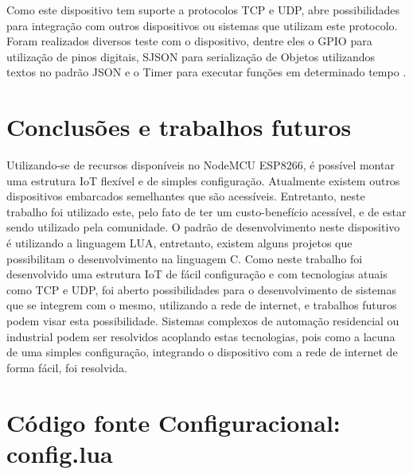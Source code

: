 \documentclass[journal]{IEEEtran}
\begin{document}
Como este dispositivo tem suporte a protocolos TCP e UDP, abre possibilidades para integração com outros dispositivos ou sistemas que utilizam este protocolo. Foram realizados diversos teste com o dispositivo, dentre eles o GPIO \cite{nodemcugpio} para utilização de pinos digitais, SJSON para serialização de Objetos utilizandos textos no padrão JSON \cite{nodemcujson} e o Timer para executar funções em determinado tempo \cite{nodemcutimer}.


\section{Conclusões e trabalhos futuros}
Utilizando-se de recursos disponíveis no NodeMCU ESP8266, é possível montar uma estrutura IoT flexível e de simples configuração. Atualmente existem outros dispositivos embarcados semelhantes que são acessíveis. Entretanto, neste trabalho foi utilizado este, pelo fato de ter um custo-benefício acessível, e de estar sendo utilizado pela comunidade. O padrão de desenvolvimento neste dispositivo é utilizando a linguagem LUA, entretanto, existem alguns projetos que possibilitam o desenvolvimento na linguagem C. Como neste trabalho foi desenvolvido uma estrutura IoT de fácil configuração e com tecnologias atuais como TCP e UDP, foi aberto possibilidades para o desenvolvimento de sistemas que se integrem com o mesmo, utilizando a rede de internet, e trabalhos futuros podem visar esta possibilidade. Sistemas complexos de automação residencial ou industrial podem ser resolvidos acoplando estas tecnologias, pois como a lacuna de uma simples configuração, integrando o dispositivo com a rede de internet de forma fácil, foi resolvida.


\newpage
\appendices

\section{Código fonte Configuracional: config.lua}
\end{document}
